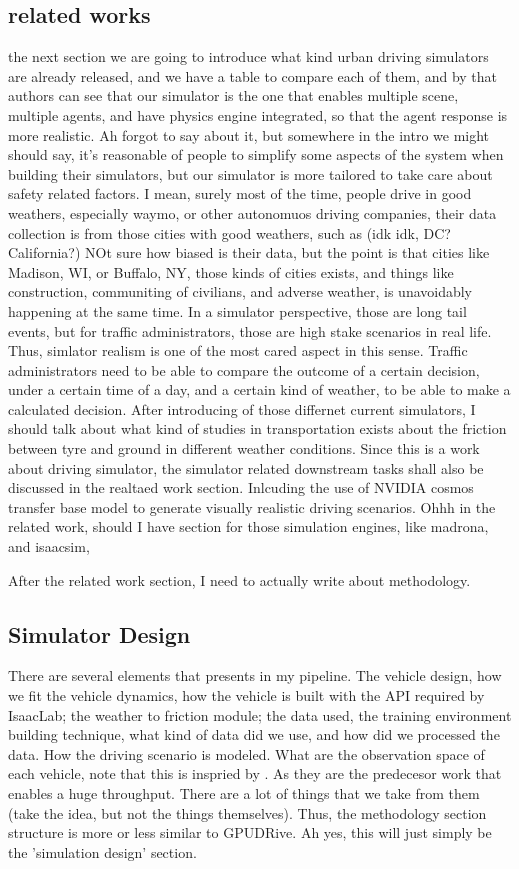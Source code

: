 \subsection{related works}
the next section we are going to introduce what kind urban driving simulators are already released, and we have a table to compare each of them, and by that authors can see that our simulator is the one that enables multiple scene, multiple agents, and have physics engine integrated, so that the agent response is more realistic. Ah forgot to say about it, but somewhere in the intro we might should say, it's reasonable of people to simplify some aspects of the system when building their simulators, but our simulator is more tailored to take care about safety related factors. I mean, surely most of the time, people drive in good weathers, especially waymo, or other autonomuos driving companies, their data collection is from those cities with good weathers, such as (idk idk, DC? California?) NOt sure how biased is their data, but the point is that cities like Madison, WI, or Buffalo, NY, those kinds of cities exists, and things like construction, communiting of civilians, and adverse weather, is unavoidably happening at the same time. In a simulator perspective, those are long tail events, but for traffic administrators, those are high stake scenarios in real life. Thus, simlator realism is one of the most cared aspect in this sense. Traffic administrators need to be able to compare the outcome of a certain decision, under a certain time of a day, and a certain kind of weather, to be able to make a  calculated decision. After introducing of those differnet current simulators, I should talk about what kind of studies in transportation exists about the friction between tyre and ground in different weather conditions. Since this is a work about driving simulator, the simulator related downstream tasks shall also be discussed in the realtaed work section. Inlcuding the use of NVIDIA cosmos transfer base model to generate visually realistic driving scenarios. 
Ohhh in the related work, should I have section for those simulation engines, like madrona, and isaacsim, 

After the related work section, I need to actually write about methodology. 

\subsection{Simulator Design}
There are several elements that presents in my pipeline. The vehicle design, how we fit the vehicle dynamics, how the vehicle is built with the API required by IsaacLab; the weather to friction module; the data used, the training environment building technique, what kind of data did we use, and how did we processed the data. How the driving scenario is modeled. What are the observation space of each vehicle, note that this is  inspried by \cite{kazemkhani_gpudrive_2025}. As they are the predecesor work that enables a huge throughput. There are a lot of things that we take from them (take the idea, but not the things themselves).
Thus, the methodology section structure is more or less similar to GPUDRive. Ah yes, this will just simply be the 'simulation design' section. 

